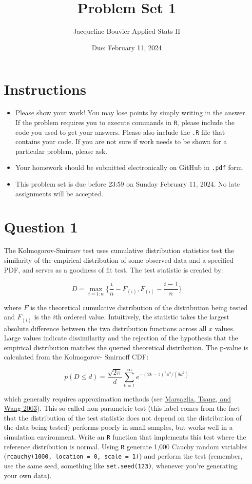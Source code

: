 \documentclass[12pt,letterpaper]{article}
\title{Problem Set 1}
\date{Due: February 11, 2024}
\author{Jacqueline Bouvier Applied Stats II}
\begin{document}
	\maketitle
	\section*{Instructions}
	\begin{itemize}
	\item Please show your work! You may lose points by simply writing in the answer. If the problem requires you to execute commands in \texttt{R}, please include the code you used to get your answers. Please also include the \texttt{.R} file that contains your code. If you are not sure if work needs to be shown for a particular problem, please ask.
\item Your homework should be submitted electronically on GitHub in \texttt{.pdf} form.
\item This problem set is due before 23:59 on Sunday February 11, 2024. No late assignments will be accepted.
	\end{itemize}

	\vspace{.25cm}
\section*{Question 1} 
\vspace{.25cm}
\noindent The Kolmogorov-Smirnov test uses cumulative distribution statistics test the similarity of the empirical distribution of some observed data and a specified PDF, and serves as a goodness of fit test. The test statistic is created by:

$$D = \max_{i=1:n} \Big\{ \frac{i}{n}  - F_{(i)}, F_{(i)} - \frac{i-1}{n} \Big\}$$

\noindent where $F$ is the theoretical cumulative distribution of the distribution being tested and $F_{(i)}$ is the $i$th ordered value. Intuitively, the statistic takes the largest absolute difference between the two distribution functions across all $x$ values. Large values indicate dissimilarity and the rejection of the hypothesis that the empirical distribution matches the queried theoretical distribution. The p-value is calculated from the Kolmogorov-
Smirnoff CDF:

$$p(D \leq d)= \frac{\sqrt {2\pi}}{d} \sum _{k=1}^{\infty }e^{-(2k-1)^{2}\pi ^{2}/(8d^{2})}$$


\noindent which generally requires approximation methods (see \href{https://core.ac.uk/download/pdf/25787785.pdf}{Marsaglia, Tsang, and Wang 2003}). This so-called non-parametric test (this label comes from the fact that the distribution of the test statistic does not depend on the distribution of the data being tested) performs poorly in small samples, but works well in a simulation environment. Write an \texttt{R} function that implements this test where the reference distribution is normal. Using \texttt{R} generate 1,000 Cauchy random variables (\texttt{rcauchy(1000, location = 0, scale = 1)}) and perform the test (remember, use the same seed, something like \texttt{set.seed(123)}, whenever you're generating your own data).\\
	
\end{document}
